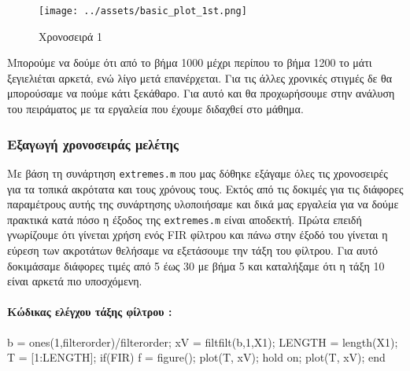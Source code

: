 \documentclass[11pt,]{article}
\newenvironment{Shaded}{}{}
\newcommand{\FloatTok}[1]{\textcolor[rgb]{0.25,0.63,0.44}{#1}}
\newcommand{\NormalTok}[1]{#1}
\let\oldparagraph\paragraph
\renewcommand{\paragraph}[1]{\oldparagraph{#1}\mbox{}}
\begin{document}
\begin{figure}
\centering
\texttt{[image: ../assets/basic\_plot\_1st.png]}
\caption{Χρονοσειρά 1}
\end{figure}

Μπορούμε να δούμε ότι από το βήμα 1000 μέχρι περίπου το βήμα 1200 το
μάτι ξεγιελιέται αρκετά, ενώ λίγο μετά επανέρχεται. Για τις άλλες
χρονικές στιγμές δε θα μπορούσαμε να πούμε κάτι ξεκάθαρο. Για αυτό και
θα προχωρήσουμε στην ανάλυση του πειράματος με τα εργαλεία που έχουμε
διδαχθεί στο μάθημα.

\hypertarget{ux3b5ux3beux3b1ux3b3ux3c9ux3b3ux3ae-ux3c7ux3c1ux3bfux3bdux3bfux3c3ux3b5ux3b9ux3c1ux3acux3c2-ux3bcux3b5ux3bbux3adux3c4ux3b7ux3c2}{%
\subsubsection{Εξαγωγή χρονοσειράς
μελέτης}\label{ux3b5ux3beux3b1ux3b3ux3c9ux3b3ux3ae-ux3c7ux3c1ux3bfux3bdux3bfux3c3ux3b5ux3b9ux3c1ux3acux3c2-ux3bcux3b5ux3bbux3adux3c4ux3b7ux3c2}}

Με βάση τη συνάρτηση \texttt{extremes.m} που μας δόθηκε εξάγαμε όλες τις
χρονοσειρές για τα τοπικά ακρότατα και τους χρόνους τους. Εκτός από τις
δοκιμές για τις διάφορες παραμέτρους αυτής της συνάρτησης υλοποιήσαμε
και δικά μας εργαλεία για να δούμε πρακτικά κατά πόσο η έξοδος της
\texttt{extremes.m} είναι αποδεκτή. Πρώτα επειδή γνωρίζουμε ότι γίνεται
χρήση ενός FIR φίλτρου και πάνω στην έξοδό του γίνεται η εύρεση των
ακροτάτων θελήσαμε να εξετάσουμε την τάξη του φίλτρου. Για αυτό
δοκιμάσαμε διάφορες τιμές από 5 έως 30 με βήμα 5 και καταλήξαμε ότι η
τάξη 10 είναι αρκετά πιο υποσχόμενη.

\hypertarget{ux3baux3ceux3b4ux3b9ux3baux3b1ux3c2-ux3b5ux3bbux3adux3b3ux3c7ux3bfux3c5-ux3c4ux3acux3beux3b7ux3c2-ux3c6ux3afux3bbux3c4ux3c1ux3bfux3c5}{%
\paragraph{Κώδικας ελέγχου τάξης φίλτρου
:}\label{ux3baux3ceux3b4ux3b9ux3baux3b1ux3c2-ux3b5ux3bbux3adux3b3ux3c7ux3bfux3c5-ux3c4ux3acux3beux3b7ux3c2-ux3c6ux3afux3bbux3c4ux3c1ux3bfux3c5}}

\begin{Shaded}
\begin{Highlighting}[]
\NormalTok{  b = ones(}\FloatTok{1}\NormalTok{,filterorder)/filterorder;}
\NormalTok{  xV = filtfilt(b,}\FloatTok{1}\NormalTok{,X1);}
\NormalTok{  LENGTH = length(X1);}
\NormalTok{  T = [}\FloatTok{1}\NormalTok{:LENGTH];}
\NormalTok{  if(FIR)}
\NormalTok{    f = figure();}
\NormalTok{    plot(T, xV);}
\NormalTok{    hold on;}
\NormalTok{    plot(T, xV);}
\NormalTok{  end}
\end{Highlighting}
\end{Shaded}
\end{document}
